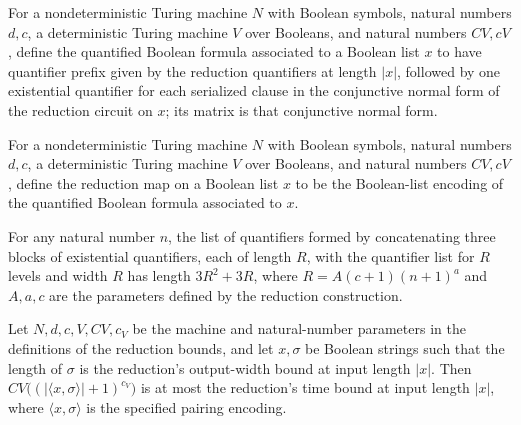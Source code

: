 \begin{definition}
\label{Complexity.TQBFHard.redQBF}
\leanok
{}
For a nondeterministic Turing machine $N$ with Boolean symbols, natural numbers $d,c$, a
deterministic Turing machine $V$ over Booleans, and natural numbers $CV,cV$, define the
quantified Boolean formula associated to a Boolean list $x$ to have quantifier prefix
given by the reduction quantifiers at length $|x|$, followed by one existential
quantifier for each serialized clause in the conjunctive normal form of the reduction
circuit on $x$; its matrix is that conjunctive normal form.
\end{definition}

\begin{definition}
\label{Complexity.TQBFHard.redMap}
\leanok
{}
For a nondeterministic Turing machine $N$ with Boolean symbols, natural numbers $d,c$, a
deterministic Turing machine $V$ over Booleans, and natural numbers $CV,cV$, define the
reduction map on a Boolean list $x$ to be the Boolean-list encoding of the quantified
Boolean formula associated to $x$.
\end{definition}

\begin{theorem}
\label{Complexity.TQBFHard.length_redQuants}
\leanok
{}
For any natural number $n$, the list of quantifiers formed by concatenating three blocks
of existential quantifiers, each of length $R$, with the quantifier list for $R$ levels
and width $R$ has length $3R^2+3R$, where $R=A(c+1)(n+1)^a$ and $A,a,c$ are the
parameters defined by the reduction construction.
\end{theorem}

\begin{theorem}
\label{Complexity.TQBFHard.time_le}
\leanok
{}
Let $N,d,c,V,CV,c_V$ be the machine and natural-number parameters in the definitions of
the reduction bounds, and let $x,\sigma$ be Boolean strings such that the length of
$\sigma$ is the reduction's output-width bound at input length $|x|$. Then
$CV\bigl((|\langle x,\sigma\rangle|+1)^{c_V}\bigr)$ is at most the reduction's time
bound at input length $|x|$, where $\langle x,\sigma\rangle$ is the specified pairing
encoding.
\end{theorem}

